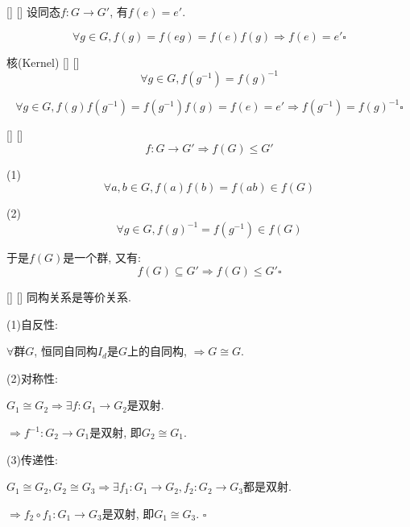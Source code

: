 \documentclass[UTF8]{ctexart}
\begin{document}
		\begin{ppt}
            []
            {}
            []
            []
			设同态$f:G\to G'$, 有$f(e)=e'$. 
		\end{ppt}
		
		\begin{prf} 
			\[\forall g\in G, f(g)=f(eg)=f(e)f(g)\Longrightarrow f(e)=e'\square\]
		\end{prf}
  
		\begin{ppt}
            []
            {核(Kernel)}
            []
            []
			\[\forall g\in G, f(g^{-1})=f(g)^{-1}\]
		\end{ppt}
		
		\begin{prf}
			\[\forall g\in G, f(g)f(g^{-1})=f(g^{-1})f(g)=f(e)=e'\Longrightarrow f(g^{-1})=f(g)^{-1}\square\]
		\end{prf}
  
		\begin{ppt}
            []
            {}
            []
            []
			\[f:G\to G'\Longrightarrow f(G)\leq G'\]
		\end{ppt}
		
		\begin{prf}
			
			(1)\[\forall a,b\in G, f(a)f(b)=f(ab)\in f(G)\]
			
			(2)\[\forall g\in G, f(g)^{-1}=f(g^{-1})\in f(G)\]
			
			于是$f(G)$是一个群, 又有: 
			\[f(G)\subseteq G'\Longrightarrow f(G)\leq G'\square\]
		\end{prf}
  
		\begin{ppt}
            []
            {}
            []
            []
			同构关系是等价关系. 
		\end{ppt}
		\begin{prf}
		
			(1)自反性: 
					
			$\forall$群$G$, 恒同自同构$I_d$是$G$上的自同构, $\Longrightarrow G\cong G$. 
			
			(2)对称性: 
			
			$G_1\cong G_2\Longrightarrow\exists f:G_1\to G_2$是双射. 
			
			$\Longrightarrow f^{-1}:G_2\to G_1$是双射, 即$G_2\cong G_1$. 
			
			(3)传递性: 
			
			$G_1\cong G_2, G_2\cong G_3\Longrightarrow\exists f_1:G_1\to G_2, f_2:G_2\to G_3$都是双射. 
			
			$\Longrightarrow f_2\circ f_1:G_1\to G_3$是双射, 即$G_1\cong G_3$. $\square$
		\end{prf}
  
\end{document}
